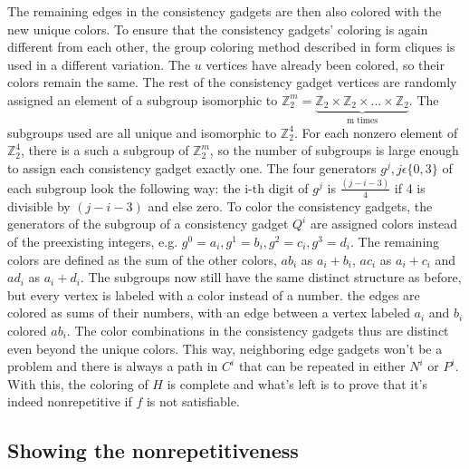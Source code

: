 \documentclass[12pt,a4paper]{article}
\begin{document}
\newline
The remaining edges in the consistency gadgets are then also colored with the new unique colors. To ensure that the consistency gadgets' coloring is again different from each other, the group coloring method described in \citep{Alon2002} form cliques is used in a different variation. The $u$ vertices have already been colored, so their colors remain the same. The rest of the consistency gadget vertices are randomly assigned an element of a subgroup isomorphic to $\mathbb{Z}^m_2 = \underbrace{\mathbb{Z}_2 \times \mathbb{Z}_2 \times ... \times \mathbb{Z}_2}_\text{m times}$. The subgroups used are all unique and isomorphic to $\mathbb{Z}^4_2$. For each nonzero element of $\mathbb{Z}^4_2$, there is a such a subgroup of $\mathbb{Z}^m_2$, so the number of subgroups is large enough to assign each consistency gadget exactly one. The four generators $g^j, j \epsilon \{0,3 \}$ of each subgroup look the following way: the i-th digit of $g^j$ is $\frac{(j-i-3)}{4}$ if 4 is divisible by $(j-i-3)$ and else zero.
\newline
To color the consistency gadgets, the generators of the subgroup of a consistency gadget $Q^i$ are assigned colors instead of the preexisting integers, e.g. $g^0 = a_i, g^1=b_i, g^2=c_i, g^3=d_i$. The remaining colors are defined as the sum of the other colors, $ab_i$ as $a_i + b_i$, $ac_i$ as $a_i + c_i$ and $ad_i$ as $a_i + d_i$. The subgroups now still have the same distinct structure as before, but every vertex is labeled with a color instead of a number. the edges are colored as sums of their numbers, with an edge between a vertex labeled $a_i$ and $b_i$ colored $ab_i$. The color combinations in the consistency gadgets thus are distinct even beyond the unique colors.
\newline
This way, neighboring edge gadgets won't be a problem and there is always a path in $C^i$ that can be repeated in either $N^i$ or $P^i$. With this, the coloring of $H$ is complete and what's left is to prove that it's indeed nonrepetitive if $f$ is not satisfiable.

\subsection{Showing the nonrepetitiveness}
\end{document}
